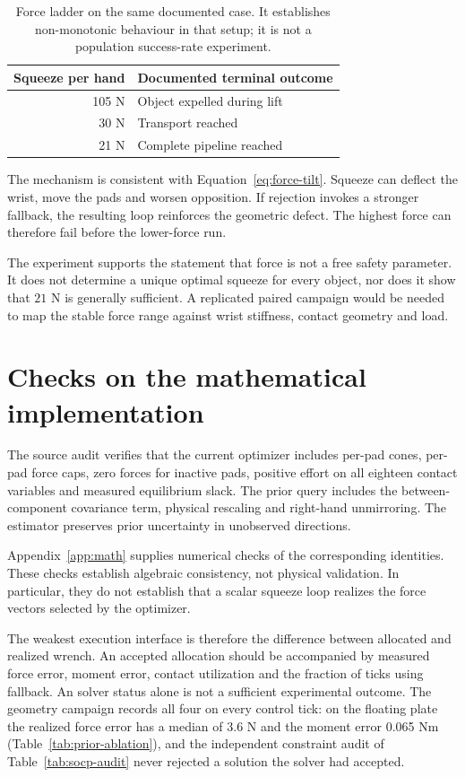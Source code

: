 \begin{table}[htbp]\centering
\begin{tabular}{@{}rl@{}}\toprule
Squeeze per hand & Documented terminal outcome\\
\midrule
105 N & Object expelled during lift\\
30 N & Transport reached\\
21 N & Complete pipeline reached\\
\bottomrule\end{tabular}
\caption{Force ladder on the same documented case. It establishes non-monotonic behaviour in that setup; it is not a population success-rate experiment.}
\label{tab:force-ladder}
\end{table}

The mechanism is consistent with Equation~\eqref{eq:force-tilt}. Squeeze can deflect the wrist, move the pads and worsen opposition. If rejection invokes a stronger fallback, the resulting loop reinforces the geometric defect. The highest force can therefore fail before the lower-force run.

The experiment supports the statement that force is not a free safety parameter. It does not determine a unique optimal squeeze for every object, nor does it show that $21$ N is generally sufficient. A replicated paired campaign would be needed to map the stable force range against wrist stiffness, contact geometry and load.

\section{Checks on the mathematical implementation}

The source audit verifies that the current optimizer includes per-pad cones, per-pad force caps, zero forces for inactive pads, positive effort on all eighteen contact variables and measured equilibrium slack. The prior query includes the between-component covariance term, physical rescaling and right-hand unmirroring. The estimator preserves prior uncertainty in unobserved directions.

Appendix~\ref{app:math} supplies numerical checks of the corresponding identities. These checks establish algebraic consistency, not physical validation. In particular, they do not establish that a scalar squeeze loop realizes the force vectors selected by the optimizer.

The weakest execution interface is therefore the difference between allocated and realized wrench. An accepted allocation should be accompanied by measured force error, moment error, contact utilization and the fraction of ticks using fallback. An  solver status alone is not a sufficient experimental outcome. The geometry campaign records all four on every control tick: on the floating plate the realized force error has a median of 3.6 N and the moment error 0.065 Nm (Table~\ref{tab:prior-ablation}), and the independent constraint audit of Table~\ref{tab:socp-audit} never rejected a solution the solver had accepted.

